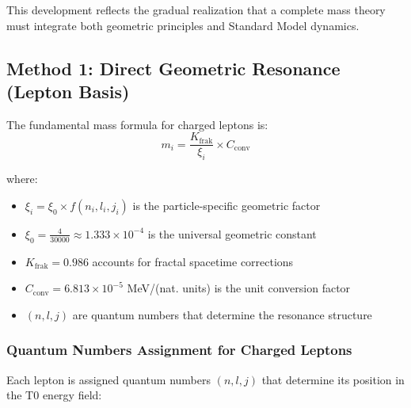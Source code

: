 	This development reflects the gradual realization that a complete mass theory must integrate both geometric principles and Standard Model dynamics.
	
	\subsection{Method 1: Direct Geometric Resonance (Lepton Basis)}
	
	The fundamental mass formula for charged leptons is:
	\begin{equation}
		\boxed{m_i = \frac{K_{\text{frak}}}{\xi_i} \times C_{\text{conv}}}
		\label{eq:t0_direct_mass}
	\end{equation}
	
	where:
	\begin{itemize}
		\item $\xi_i = \xi_0 \times f(n_i, l_i, j_i)$ is the particle-specific geometric factor
		\item $\xi_0 = \frac{4}{30000} \approx 1.333 \times 10^{-4}$ is the universal geometric constant
		\item $K_{\text{frak}} = 0.986$ accounts for fractal spacetime corrections
		\item $C_{\text{conv}} = 6.813 \times 10^{-5}$ MeV/(nat. units) is the unit conversion factor
		\item $(n, l, j)$ are quantum numbers that determine the resonance structure
	\end{itemize}
	
	\subsubsection{Quantum Numbers Assignment for Charged Leptons}
	
	Each lepton is assigned quantum numbers $(n, l, j)$ that determine its position in the T0 energy field:
	
	\begin{table}[h]
		\centering
		\caption{T0 quantum numbers for charged leptons (corrected)}
		\label{tab:lepton_qn_direkt}
	\end{table}


